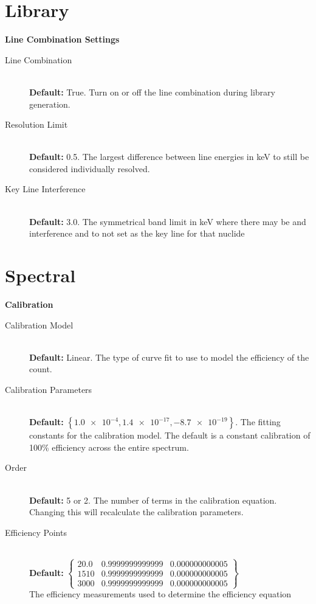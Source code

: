 \documentclass[12pt,report,justified]{SANDreport}
\begin{document}
\section{Library}\label{sec:set_lib}
\begin{center}
{\large \textbf{Line Combination Settings}}
\end{center}
\begin{description}
\item[Line Combination]\label{itm:ln_combo} \hfill \\
\textbf{Default:} True. Turn on or off the line combination during library generation.
\item[Resolution Limit]\label{itm:res_lim} \hfill \\
\textbf{Default:} 0.5. The largest difference between line energies in keV to still be considered
individually resolved.
\item[Key Line Interference]\label{itm:ky_inf} \hfill \\
 \textbf{Default:} 3.0. The symmetrical band limit in keV where there may be and interference and to
not set as the key line for that nuclide
\end{description}

\section{Spectral}\label{sec:set_spec}

\begin{center}
{\large \textbf{Calibration}}
\end{center}
\begin{description}
\item[Calibration Model]\label{itm:cal_model} \hfill \\
\textbf{Default:} Linear. The type of curve fit to use to model the efficiency of the count.
\item[Calibration Parameters]\label{itm:cal_coeff} \hfill \\
\textbf{Default:} \( \left\{ \num{1.0e-4}, \num{1.4e-17}, \num{-8.7e-19}  \right\}\). The fitting constants for the
calibration model. The default is a constant calibration of 100\% efficiency across the entire
spectrum.
\item[Order]\label{itm:cal_order} \hfill \\
 \textbf{Default:} 5 or 2. The number of terms in the calibration equation. Changing this will recalculate
the calibration parameters.
\item[Efficiency Points]\label{itm:eff_pts} \hfill \\
 \textbf{Default:} \(
\left\{ \begin{matrix}
20.0 & 0.9999999999999 & 0.000000000005 \\
1510 & 0.9999999999999 & 0.000000000005  \\
3000 & 0.9999999999999 & 0.000000000005
 \end{matrix}
 \right\} \) \\
The efficiency measurements used to determine the efficiency equation
\end{description}
\end{document}
